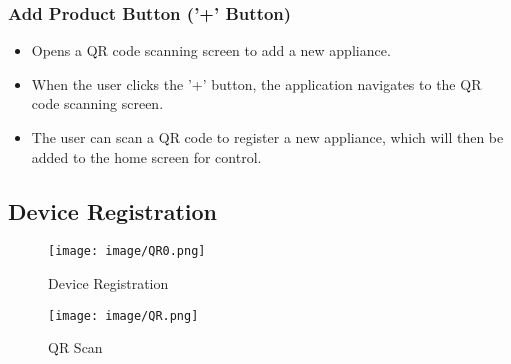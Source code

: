 \documentclass[conference]{IEEEtran}
\begin{document}
\subsubsection{Add Product Button ('+' Button)}
\begin{itemize}
    \item Opens a QR code scanning screen to add a new appliance.\\
    \item When the user clicks the '+' button, the application navigates to the QR code scanning screen.\\
    \item The user can scan a QR code to register a new appliance, which will then be added to the home screen for control.\\
\end{itemize}

\subsection{Device Registration}

\begin{figure}[h!]
    \centering
    \texttt{[image: image/QR0.png]}
    \caption{Device Registration}
    \label{fig:enter-label}
\end{figure}
\begin{figure}[h!]
    \centering
    \texttt{[image: image/QR.png]}
    \caption{QR Scan}
    \label{fig:enter-label}
\end{figure}
\end{document}
